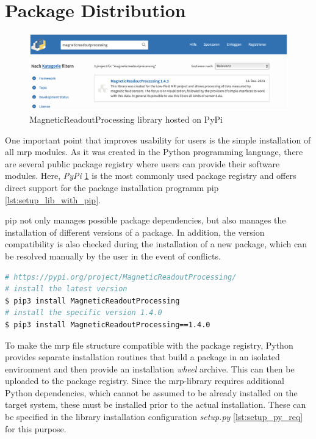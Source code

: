 \hypertarget{package-distribution}{%
\section{Package Distribution}\label{package-distribution}}

\begin{figure}
\centering
\includegraphics{./generated_images/border_MagneticReadoutProcessing_library_hosted_on_PyPi.png}
\caption{MagneticReadoutProcessing library hosted on PyPi
\label{MagneticReadoutProcessing_library_hosted_on_PyPi.png}}
\end{figure}

One important point that improves usability for users is the simple
installation of all \gls{mrp} modules. As it was created in the Python
programming language, there are several public package registry where
users can provide their software modules. Here, \emph{PyPi}
\cite{PyPI}
\ref{MagneticReadoutProcessing_library_hosted_on_PyPi.png}
\cite{MagneticReadoutProcessingPyPI} is the most commonly used
package registry and offers direct support for the package installation
programm \gls{pip} \ref{lst:setup_lib_with_pip}.

\gls{pip} not only manages possible package dependencies, but also
manages the installation of different versions of a package. In
addition, the version compatibility is also checked during the
installation of a new package, which can be resolved manually by the
user in the event of conflicts.

\begin{lstlisting}[language=bash, caption={Bash commands to install the MagneticReadoutProcessing library using pip}, label=lst:setup_lib_with_pip]
# https://pypi.org/project/MagneticReadoutProcessing/
# install the latest version
$ pip3 install MagneticReadoutProcessing
# install the specific version 1.4.0
$ pip3 install MagneticReadoutProcessing==1.4.0
\end{lstlisting}

To make the \gls{mrp} file structure compatible with the package
registry, Python provides separate installation routines that build a
package in an isolated environment and then provide an installation
\emph{wheel} archive. This can then be uploaded to the package registry.
Since the \gls{mrp}-library requires additional Python dependencies,
which cannot be assumed to be already installed on the target system,
these must be installed prior to the actual installation. These can be
specified in the library installation configuration \emph{setup.py}
\ref{lst:setup_py_req} for this purpose.

